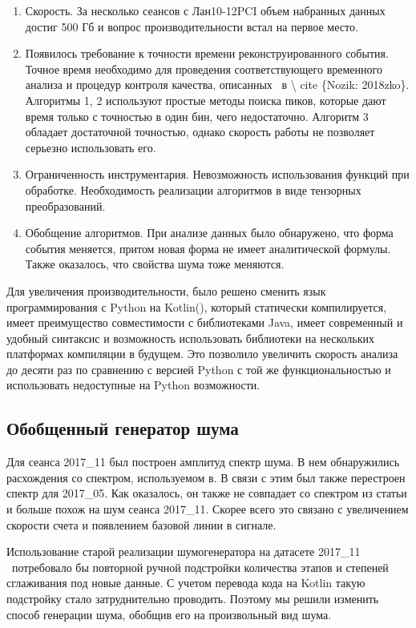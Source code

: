 \documentclass[a4paper,14pt]{extreport}
\begin{document}
\begin{enumerate}
    \item Скорость. За несколько сеансов с Лан10-12PCI объем набранных данных достиг 500 Гб и вопрос производительности встал на первое место.
    \item Появилось требование к точности времени реконструированного события. Точное время необходимо для проведения соответствующего временного анализа и процедур контроля качества, описанных ~в {\textbackslash} cite \{Nozik: 2018zko\}. Алгоритмы 1, 2 используют простые методы поиска пиков, которые дают время только с точностью в один бин, чего недостаточно. Алгоритм 3 обладает достаточной точностью, однако скорость работы не позволяет серьезно использовать его.
    \item Ограниченность инструментария. Невозможность использования функций при обработке. Необходимость реализации алгоритмов в виде тензорных преобразований.
    \item Обобщение алгоритмов. При анализе данных было обнаружено, что форма события меняется, притом новая форма не имеет аналитической формулы. Также оказалось, что свойства шума тоже меняются.
\end{enumerate}

Для увеличения производительности, было решено сменить язык программирования с Python на Kotlin(\cite{jemerov2016kotlin}), который статически компилируется, имеет преимущество совместимости с библиотеками Java, имеет современный и удобный синтаксис и возможность использовать библиотеки на нескольких платформах компиляции в будущем. Это позволило увеличить скорость анализа до десяти раз по сравнению с версией Python с той же функциональностью и использовать недоступные на Python возможности.

\subsection{Обобщенный генератор шума}

Для сеанса 2017\_11 был построен амплитуд спектр шума. В нем обнаружились расхождения со спектром, используемом в. В связи с этим был также перестроен спектр для 2017\_05. Как оказалось, он также не совпадает со спектром из статьи и больше похож на шум сеанса 2017\_11. Скорее всего это связано с увеличением скорости счета и появлением базовой линии в сигнале.

Использование старой реализации шумогенератора на датасете 2017\_11 ~потребовало бы повторной ручной подстройки количества этапов и степеней сглаживания под новые данные. С учетом перевода кода на Kotlin такую подстройку стало затруднительно проводить. Поэтому мы решили изменить способ генерации шума, обобщив его на произвольный вид шума.
\end{document}
